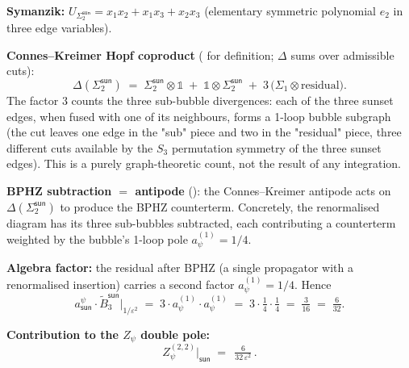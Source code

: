 \documentclass[11pt,a4paper]{article}
\theoremstyle{definition}
\theoremstyle{plain}
\begin{document}
\begin{cfacbox}
\begin{center}
\end{center}
\textbf{Symanzik:}
$U_{\Sigma_2^{\textsf{sun}}} = x_1 x_2 + x_1 x_3 + x_2 x_3$
(elementary symmetric polynomial $e_2$ in three edge variables).

\textbf{Connes--Kreimer Hopf coproduct} ( for
definition; $\Delta$ sums over admissible cuts):
\begin{equation}\label{eq:sunset-coproduct}
  \Delta(\Sigma_2^{\textsf{sun}})
  \;=\; \Sigma_2^{\textsf{sun}} \otimes \mathbb{1}
        \;+\; \mathbb{1} \otimes \Sigma_2^{\textsf{sun}}
        \;+\; 3\,\bigl(\Sigma_1 \otimes \text{residual}\bigr).
\end{equation}
The factor $3$ counts the three sub-bubble divergences: each of the
three sunset edges, when fused with one of its neighbours, forms a
1-loop bubble subgraph (the cut leaves one edge in the "sub" piece
and two in the "residual" piece, three different cuts available by
the $S_3$ permutation symmetry of the three sunset edges).  This is
a purely graph-theoretic count, not the result of any integration.

\textbf{BPHZ subtraction $=$ antipode} (): the
Connes--Kreimer antipode acts on $\Delta(\Sigma_2^{\textsf{sun}})$ to
produce the BPHZ counterterm.  Concretely, the renormalised diagram
has its three sub-bubbles subtracted, each contributing a counterterm
weighted by the bubble's 1-loop pole $a_\psi^{(1)} = 1/4$.

\textbf{Algebra factor:} the residual after BPHZ (a single propagator
with a renormalised insertion) carries a second factor $a_\psi^{(1)} =
1/4$.  Hence
\[
  a^\psi_{\textsf{sun}} \cdot \tilde B_3^{\textsf{sun}}\big|_{1/\varepsilon^2}
  \;=\; 3 \cdot a_\psi^{(1)} \cdot a_\psi^{(1)}
  \;=\; 3 \cdot \tfrac{1}{4} \cdot \tfrac{1}{4}
  \;=\; \tfrac{3}{16} \;=\; \tfrac{6}{32}.
\]

\textbf{Contribution to the $Z_\psi$ double pole:}
\begin{equation}
  Z_\psi^{(2,2)}\big|_{\textsf{sun}}
  \;=\; \boxed{\,\tfrac{6}{32\,\varepsilon^2}\,}.
\end{equation}
\end{cfacbox}
\end{document}
